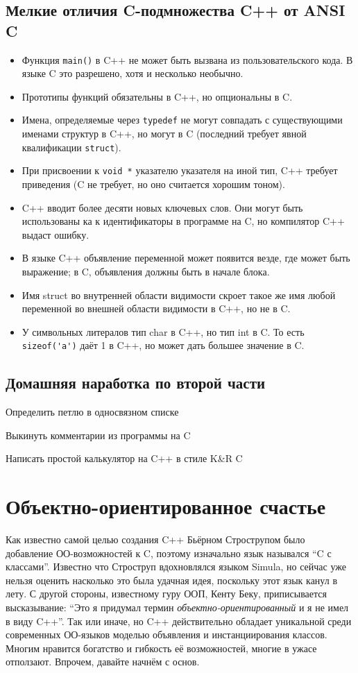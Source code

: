 \documentclass[a4paper,12pt,oneside]{article}
\begin{document}
\subsection{Мелкие отличия C-подмножества C++ от ANSI C}

\begin{itemize}
\item
Функция \lstinline!main()! в C++ не может быть вызвана из пользовательского кода. В языке C это разрешено, хотя и несколько необычно.
\item
Прототипы функций обязательны в C++, но опциональны в C.
\item
Имена, определяемые через \lstinline!typedef! не могут совпадать с существующими именами структур в C++, но могут в C (последний требует явной квалификации \lstinline!struct!).
\item
При присвоении к \lstinline!void *! указателю указателя на иной тип, C++ требует приведения (C не требует, но оно считается хорошим тоном).
\item
C++ вводит более десяти новых ключевых слов. Они могут быть использованы ка к идентификаторы в программе на C, но компилятор C++ выдаст ошибку.
\item
В языке C++ объявление переменной может появится везде, где может быть выражение; в C, объявления должны быть в начале блока.
\item
Имя struct во внутренней области видимости скроет такое же имя любой переменной во внешней области видимости в C++, но не в C.
\item
У символьных литералов тип char в C++, но тип int в C. То есть \lstinline!sizeof('a')! даёт 1 в C++, но может дать большее значение в C.
\end{itemize}

\subsection{Домашняя наработка по второй части}

Определить петлю в односвязном списке

Выкинуть комментарии из программы на C

Написать простой калькулятор на C++ в стиле K\&R C

\pagebreak
\section{Объектно-ориентированное счастье}

Как известно самой целью создания C++ Бьёрном Строструпом было добавление ОО-возможностей к C, поэтому изначально язык назывался ``C с классами''. Известно что Строструп вдохновлялся языком Simula, но сейчас уже нельзя оценить насколько это была удачная идея, поскольку этот язык канул в лету. С другой стороны, известному гуру ООП, Кенту Беку, приписывается высказывание: ``Это я придумал термин \textit{объектно-ориентированный} и я не имел в виду C++''. Так или иначе, но C++ действительно обладает уникальной среди современных ОО-языков моделью объявления и инстанциирования классов. Многим нравится богатство и гибкость её возможностей, многие в ужасе отползают. Впрочем, давайте начнём с основ.
\end{document}
